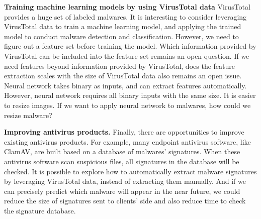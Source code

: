 {\bf Training machine learning models by using VirusTotal data}
VirusTotal provides a huge set of labeled malwares. 
It is interesting to consider leveraging VirusTotal data to train a machine learning model, 
and applying the trained model to conduct malware detection and classification. 
However, we need to figure out a feature set before training the model. 
Which information provided by VirusTotal can be included into the feature set remains an open question. 
If we need features beyond information provided by VirusTotal, does the feature extraction scales with the size of VirusTotal data also remains an open issue. 
Neural network takes binary as inputs, and can extract features automatically. 
However, neural network requires all binary inputs with the same size. 
It is easier to resize images. If we want to apply neural network to malwares, how could we resize malware? 

{\bf Improving antivirus products.} 
Finally, there are opportunities to improve existing antivirus products. 
For example, many endpoint antivirus software, like ClamAV, are built based on a database of malwares' signatures. 
When these antivirus software scan suspicious files, all signatures in the database will be checked. 
It is possible to explore how to automatically extract malware signatures by leveraging VirusTotal data, instead of extracting them manually.
And if we can precisely predict which malware will appear in the near future, 
we could reduce the size of signatures sent to clients' side and also reduce time to check the signature database. 


